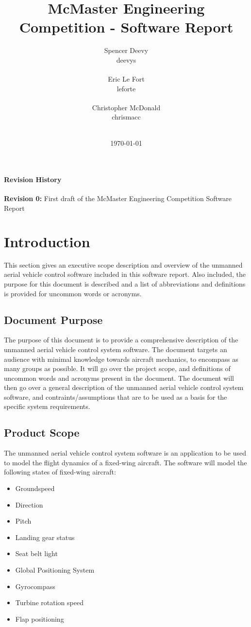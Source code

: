 \documentclass[titlepage]{article}
\title{McMaster Engineering Competition - Software Report}
\author
{
	Spencer Deevy\\
	deevys\\\\
	Eric Le Fort\\
	leforte\\\\
	Christopher McDonald\\
	chrismacc\\\\
}
\date{\today}
\begin{document}
\maketitle
\newpage
\tableofcontents
\vfill \noindent
{\large \bf Revision History}\\\\
\textbf{Revision 0:} First draft of the McMaster Engineering Competition Software Report
\newpage

\section{Introduction}
This section gives an executive scope description and overview of the unmanned aerial vehicle control software included in this software report. Also included,
the purpose for this document is described and a list of abbreviations and definitions is provided for uncommon words or acronyms.
 
\subsection{Document Purpose}
The purpose of this document is to provide a comprehensive description of the unmanned aerial vehicle control system software. The document targets an audience with minimal knowledge towards aircraft mechanics, to encompass as many groups as possible. It will go over the project scope, and definitions of uncommon words and acronyms present in the document. The document will then go over a general description of the unmanned aerial vehicle control system software, and contraints/assumptions that are to be used as a basis for the specific system requirements.

\subsection{Product Scope}
The unmanned aerial vehicle control system software is an application to be used to model the flight dynamics of a fixed-wing aircraft. The software will model the following states of fixed-wing aircraft:

\begin{itemize}
\item Groundspeed
\item Direction
\item Pitch
\item Landing gear status
\item Seat belt light
\item Global Positioning System
\item Gyrocompass
\item Turbine rotation speed
\item Flap positioning
\end{itemize}
\end{document}
